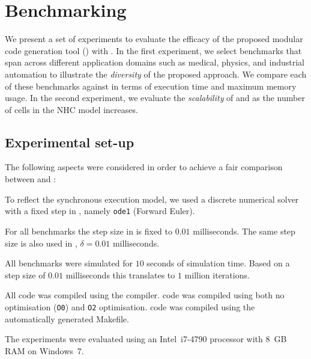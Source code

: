 \section{Benchmarking}
\label{sec:benchmarking}


We present a set of experiments to evaluate the efficacy of the proposed modular code generation tool (\ourTool) with \simulink. 
In the first experiment, we select benchmarks that span across different application domains such as medical, physics, and industrial automation to illustrate the \emph{diversity} of the proposed approach.
We compare each of these benchmarks against \simulink in terms of execution time and maximum memory usage.
In the second experiment, we evaluate the \emph{scalability} of \ourTool and \simulink as the number of cells in the \ac{NHC} model increases. 


\subsection{Experimental set-up}
\label{sec:experimentalSetUp}
The following aspects were considered in order to achieve a fair comparison between \ourTool and \simulink:

\begin{description}
	\item[\textbf{Solver}] To reflect the synchronous execution model, we used a discrete numerical solver with a fixed step in \simulink, namely \texttt{ode1} (Forward Euler).
	
	\item[\textbf{Step Size}] For all benchmarks the step size in \simulink is fixed to $0.01$ milliseconds.
	The same step size is also used in \ourTool, $\delta = 0.01$ milliseconds.
	
	\item[\textbf{Time}] All benchmarks were simulated for $10$ seconds of simulation time.
	Based on a step size of $0.01$ milliseconds this translates to $1$ million iterations.
	
	\item[\textbf{Compiler}] All code was compiled using the \compiler compiler.
	\ourTool code was compiled using both no optimisation (\texttt{O0}) and \texttt{O2} optimisation.
	\simulink code was compiled using the automatically generated Makefile.
\end{description}

The experiments were evaluated using an Intel~i7-4790 processor with 8~GB RAM on Windows~7. 



